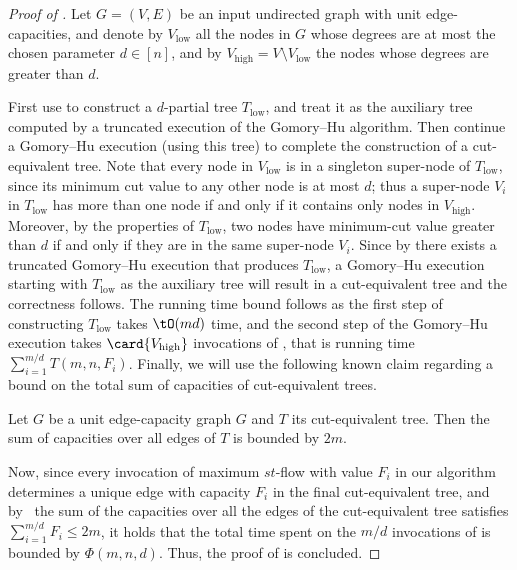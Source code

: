 \begin{proof}[Proof of ]
Let $G=(V,E)$ be an input undirected graph with unit edge-capacities,
and denote by $V_{\mathrm{low}}$ all the nodes in $G$ whose degrees are at most
the chosen parameter $d\in [n]$,
and by $V_{\mathrm{high}}=V\setminus V_{\mathrm{low}}$ the nodes whose degrees are greater than $d$.

First use  to construct a $d$-partial tree $T_{\mathrm{low}}$,
and treat it as the auxiliary tree computed by a truncated execution
of the Gomory--Hu algorithm.
Then continue a Gomory--Hu execution (using this tree)
to complete the construction of a cut-equivalent tree.
Note that every node in $V_{\mathrm{low}}$ is in a singleton super-node of $T_{\mathrm{low}}$, since its minimum cut value to any other node is at most $d$; thus a super-node $V_i$ in $T_{\mathrm{low}}$ has more than one node if and only if it contains only nodes in $V_{\mathrm{high}}$.
Moreover, by the properties of $T_{\mathrm{low}}$, two nodes have minimum-cut value greater than $d$ if and only if they are in the same super-node $V_i$.
Since by  there exists a truncated Gomory--Hu execution that produces $T_{\mathrm{low}}$, a Gomory--Hu execution starting with $T_{\mathrm{low}}$ as the auxiliary tree will result in a cut-equivalent tree and the correctness follows.
The running time bound follows as the first step of constructing $T_{\mathrm{low}}$ takes $\tO( m d )$ time,
and the second step of the Gomory--Hu execution
takes $\card{V_{\mathrm{high}}}$ invocations of \MF, that is running time $\sum_{i=1}^{m/d}T(m,n,F_i)$.
Finally, we will use the following known claim regarding a bound on the total sum of capacities of cut-equivalent trees.
\begin{claim}\label{tree_bound}
Let $G$ be a unit edge-capacity graph $G$ and $T$ its cut-equivalent tree. Then the sum of capacities over all edges of $T$ is bounded by $2m$.
\end{claim}
Now, since every invocation of maximum $st$-flow with value $F_i$ in our algorithm determines a unique edge with capacity $F_i$ in the final cut-equivalent tree, and by~ the sum of the capacities over all the edges of the cut-equivalent tree satisfies
$\sum_{i=1}^{m/d} F_i\leq 2m$,
it holds that the total time spent on the $m/d$ invocations of \MF is bounded by $\Phi(m,n,d)$.
Thus, the proof of  is concluded.
\end{proof}

